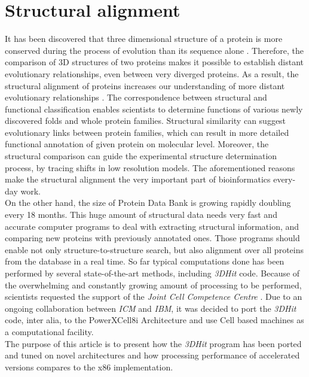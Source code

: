 \documentclass[envcountsame,envcountchap]{svmono}
\newcommand{\icm}{\emph{ICM}}
\newcommand{\ibm}{\emph{IBM}}
\newcommand{\prog}{\emph{3DHit}}
\begin{document}
\section{Structural alignment}
It has been discovered that three dimensional structure of a protein is more
conserved during the process of evolution than its sequence alone \cite{chle}.
Therefore, the comparison of 3D structures of two proteins makes it possible to
establish distant evolutionary relationships, even between very diverged proteins.
As a result, the structural alignment of proteins increases our understanding of
more distant evolutionary relationships \cite{buj2000,jms}.
The correspondence between structural and functional classification enables
scientists to determine functions of various newly discovered folds and whole
protein families. Structural similarity can suggest evolutionary links between protein
families, which can result in more detailed functional annotation
of given protein on molecular level.
Moreover, the structural comparison can guide the experimental structure
determination process, by tracing shifts in low resolution
models.
The aforementioned reasons make the structural alignment the 
very important part of bioinformatics every-day work.\\
On the other hand, the size of Protein Data Bank \cite{pdb} 
is growing rapidly doubling every 18 months.
This huge amount of structural data needs very fast and accurate computer programs to deal
with extracting structural information, and comparing new proteins with previously 
annotated ones.
Those programs should enable not only
structure-to-structure search, but also alignment over all proteins from the
database in a real time.
So far typical computations done has been performed by several state-of-the-art methods,
including \prog{} code.
Because of the overwhelming and constantly growing 
amount of processing to be performed, scientists requested
the support of the \emph{Joint Cell Competence Centre} \cite{jccc}.
Due to an ongoing collaboration between \icm{} and \ibm{}, it was decided to
port the \prog{} code, inter alia, to the PowerXCell8i Architecture and use Cell
based machines as a computational facility.\\
The purpose of this article is to present how the \prog{} program has been
ported and tuned on novel architectures and how processing performance of
accelerated versions compares to the x86 implementation.
\end{document}
